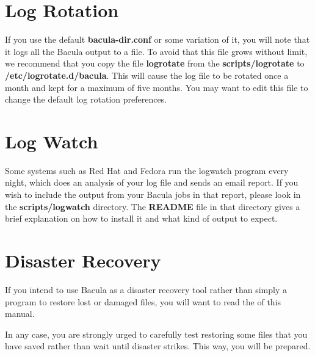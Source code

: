 \section{Log Rotation}
If you use the default {\bf bacula-dir.conf} or some variation of it, you will
note that it logs all the Bacula output to a file. To avoid that this file
grows without limit, we recommend that you copy the file {\bf logrotate} from
the {\bf scripts/logrotate} to {\bf /etc/logrotate.d/bacula}. This will cause
the log file to be rotated once a month and kept for a maximum of five months.
You may want to edit this file to change the default log rotation preferences.

\section{Log Watch}
Some systems such as Red Hat and Fedora run the logwatch program
every night, which does an analysis of your log file and sends an
email report.  If you wish to include the output from your Bacula 
jobs in that report, please look in the {\bf scripts/logwatch}
directory.  The {\bf README} file in that directory gives a brief
explanation on how to install it and what kind of output to expect.


\section{Disaster Recovery}

If you intend to use Bacula as a disaster recovery tool rather than simply a
program to restore lost or damaged files, you will want to read the 
 of
this manual. 

In any case, you are strongly urged to carefully test restoring some files
that you have saved rather than wait until disaster strikes. This way, you
will be prepared.
